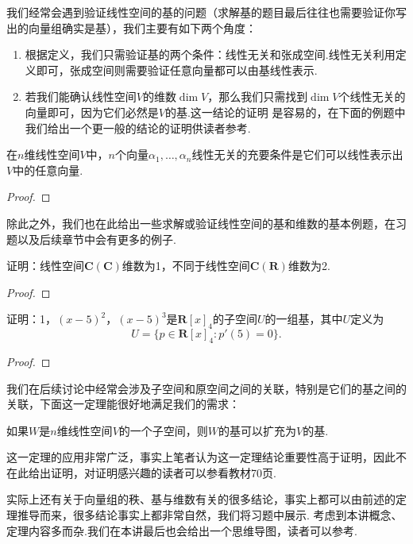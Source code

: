 我们经常会遇到验证线性空间的基的问题（求解基的题目最后往往也需要验证你写出的向量组确实是基），我们主要有如下两个角度：
\begin{enumerate}
    \item 根据定义，我们只需验证基的两个条件：线性无关和张成空间.线性无关利用定义即可，张成空间则需要验证任意向量都可以由基线性表示.
    \item 若我们能确认线性空间$V$的维数$\dim V$，那么我们只需找到$\dim V$个线性无关的向量即可，因为它们必然是$V$的基.这一结论的证明
    是容易的，在下面的例题中我们给出一个更一般的结论的证明供读者参考.
\end{enumerate}
\begin{example}
    在$n$维线性空间$V$中，$n$个向量$\alpha_1,\ldots,\alpha_n$线性无关的充要条件是它们可以线性表示出$V$中的任意向量.
\end{example}
\begin{proof}
    
\end{proof}

除此之外，我们也在此给出一些求解或验证线性空间的基和维数的基本例题，在习题以及后续章节中会有更多的例子.
\begin{example}\label{ex:3:不同数域的维数}
    证明：线性空间$\mathbf{C(C)}$维数为1，不同于线性空间$\mathbf{C(R)}$维数为2.
\end{example}
\begin{proof}
    
\end{proof}
\begin{example}
    证明：1，$(x-5)^2$，$(x-5)^3$是$\mathbf{R}[x]_4$的子空间$U$的一组基，其中$U$定义为
    \[U=\{p\in\mathbf{R}[x]_4:p'(5)=0\}.\]
\end{example}
\begin{proof}
    
\end{proof}

我们在后续讨论中经常会涉及子空间和原空间之间的关联，特别是它们的基之间的关联，下面这一定理能很好地满足我们的需求：
\begin{theorem}
	如果$W$是$n$维线性空间$V$的一个子空间，则$W$的基可以扩充为$V$的基.
\end{theorem}
这一定理的应用非常广泛，事实上笔者认为这一定理结论重要性高于证明，因此不在此给出证明，对证明感兴趣的读者可以参看教材70页.

实际上还有关于向量组的秩、基与维数有关的很多结论，事实上都可以由前述的定理推导而来，很多结论事实上都非常自然，我们将习题中展示.
考虑到本讲概念、定理内容多而杂.我们在本讲最后也会给出一个思维导图，读者可以参考.

